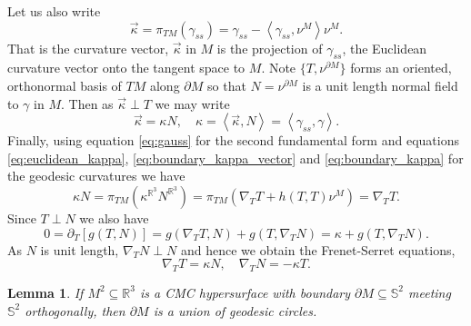 \documentclass[10pt]{amsart}
\newcommand{\IP}[2]{\left< #1 , #2 \right>}
\newcommand{\R}{\ensuremath{\mathbb{R}}}
\renewcommand{\S}{\ensuremath{\mathbb{S}}}
\newtheorem{lem}[thm]{Lemma}
\theoremstyle{remark}
\begin{document}
Let us also write
\begin{equation}
\label{eq:boundary_kappa_vector}
\vec{\kappa} = \pi_{TM} (\gamma_{ss}) = \gamma_{ss} - \IP{\gamma_{ss}}{\nu^M} \nu^M.
\end{equation}
That is the curvature vector, \(\vec{\kappa}\) in \(M\) is the projection of \(\gamma_{ss}\), the Euclidean curvature vector onto the tangent space to \(M\). Note \(\{T, \nu^{\partial M}\}\) forms an oriented, orthonormal basis of \(TM\) along \(\partial M\) so that \(N = \nu^{\partial M}\) is a unit length normal field to \(\gamma\)  in \(M\). Then as \(\vec{\kappa} \perp T\) we may write 
\begin{equation}
\label{eq:boundary_kappa}
\vec{\kappa} = \kappa N, \quad \kappa = \IP{\vec{\kappa}}{N} = \IP{\gamma_{ss}}{\gamma}.
\end{equation}
Finally, using equation \eqref{eq:gauss} for the second fundamental form and equations \eqref{eq:euclidean_kappa}, \eqref{eq:boundary_kappa_vector} and \eqref{eq:boundary_kappa} for the geodesic curvatures we have 
\[
\kappa N = \pi_{TM} (\kappa^{\R^3} N^{\R^3}) = \pi_{TM} (\nabla_T T + h(T, T) \nu^M) = \nabla_T T.
\]
Since \(T \perp N\) we also have
\[
0 = \partial_T [g(T, N)] = g(\nabla_T T, N) + g(T, \nabla_T N) = \kappa + g(T, \nabla_T N).
\]
As \(N\) is unit length, \(\nabla_T N \perp N\) and hence we obtain the Frenet-Serret equations,
\begin{equation}
\label{eq:frenet_serret}
\nabla_T T = \kappa N, \quad \nabla_T N = -\kappa T.
\end{equation}

\begin{lem}
If \(M^2 \subseteq \R^3\) is a CMC hypersurface with boundary \(\partial M \subseteq \S^2\) meeting \(\S^2\) orthogonally, then \(\partial M\) is a union of geodesic circles.
\end{lem}
\end{document}
